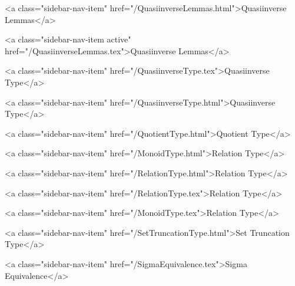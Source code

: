       
    
      
        
          <a class="sidebar-nav-item" href="/QuasiinverseLemmas.html">Quasiinverse Lemmas</a>
        
      
    
      
        
          <a class="sidebar-nav-item active" href="/QuasiinverseLemmas.tex">Quasiinverse Lemmas</a>
        
      
    
      
        
          <a class="sidebar-nav-item" href="/QuasiinverseType.tex">Quasiinverse Type</a>
        
      
    
      
        
          <a class="sidebar-nav-item" href="/QuasiinverseType.html">Quasiinverse Type</a>
        
      
    
      
        
          <a class="sidebar-nav-item" href="/QuotientType.html">Quotient Type</a>
        
      
    
      
        
          <a class="sidebar-nav-item" href="/MonoidType.html">Relation Type</a>
        
      
    
      
        
          <a class="sidebar-nav-item" href="/RelationType.html">Relation Type</a>
        
      
    
      
        
          <a class="sidebar-nav-item" href="/RelationType.tex">Relation Type</a>
        
      
    
      
        
          <a class="sidebar-nav-item" href="/MonoidType.tex">Relation Type</a>
        
      
    
      
        
          <a class="sidebar-nav-item" href="/SetTruncationType.html">Set Truncation Type</a>
        
      
    
      
        
          <a class="sidebar-nav-item" href="/SigmaEquivalence.tex">Sigma Equivalence</a>
        
